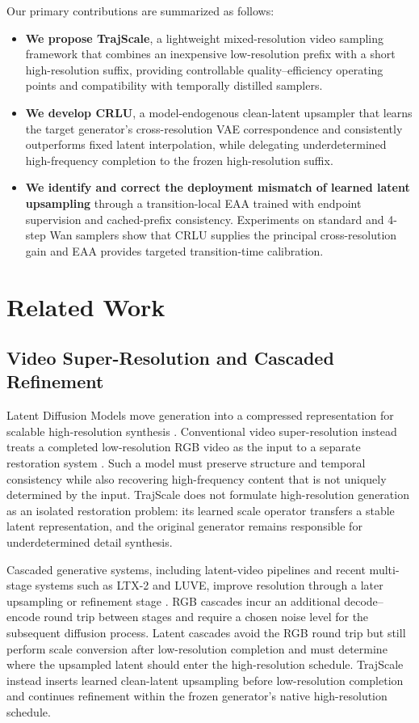 Our primary contributions are summarized as follows:
\begin{itemize}
\item \textbf{We propose TrajScale}, a lightweight mixed-resolution video sampling framework that combines an inexpensive low-resolution prefix with a short high-resolution suffix, providing controllable quality--efficiency operating points and compatibility with temporally distilled samplers.
\item \textbf{We develop CRLU}, a model-endogenous clean-latent upsampler that learns the target generator's cross-resolution VAE correspondence and consistently outperforms fixed latent interpolation, while delegating underdetermined high-frequency completion to the frozen high-resolution suffix.
\item \textbf{We identify and correct the deployment mismatch of learned latent upsampling} through a transition-local EAA trained with endpoint supervision and cached-prefix consistency. Experiments on standard and 4-step Wan samplers show that CRLU supplies the principal cross-resolution gain and EAA provides targeted transition-time calibration.
\end{itemize}

\section{Related Work}

\subsection{Video Super-Resolution and Cascaded Refinement}
Latent Diffusion Models move generation into a compressed representation for
scalable high-resolution synthesis \citep{rombach2022ldm}. Conventional video
super-resolution instead treats a completed low-resolution RGB video as the
input to a separate restoration system \citep{zhou2024upscale,xu2024videogigagan}.
Such a model must preserve structure and temporal consistency while also
recovering high-frequency content that is not uniquely determined by the
input. TrajScale does not formulate high-resolution generation as an isolated
restoration problem: its learned scale operator transfers a stable latent
representation, and the original generator remains responsible for
underdetermined detail synthesis.

Cascaded generative systems, including latent-video pipelines and recent
multi-stage systems such as LTX-2 and LUVE, improve resolution through a later
upsampling or refinement stage
\citep{blattmann2023videoldm,hacohen2026ltx2,zhao2026luve}. RGB cascades incur
an additional decode--encode round trip between stages and require a chosen
noise level for the subsequent diffusion process. Latent cascades avoid the
RGB round trip but still perform scale conversion after low-resolution
completion and must determine where the upsampled latent should enter the
high-resolution schedule. TrajScale instead inserts learned clean-latent
upsampling before low-resolution completion and continues refinement within
the frozen generator's native high-resolution schedule.

